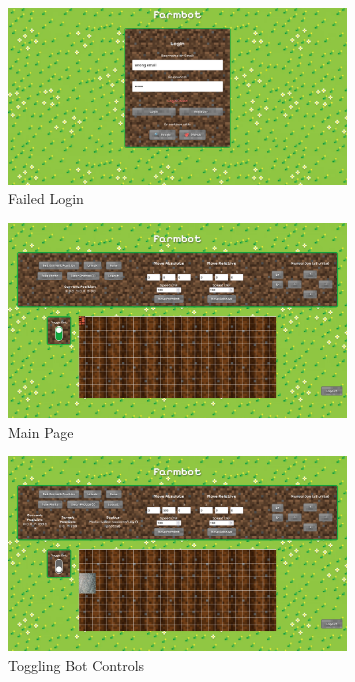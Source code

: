 \begin{figure}[H]
    \centering
    \includegraphics[width=0.8\textwidth]{img/failed_login.png}
    \caption{Failed Login}
    \label{fig:dashboard_failed_login}
\end{figure}

\begin{figure}[H]
    \centering
    \includegraphics[width=0.8\textwidth]{img/main_page.png}
    \caption{Main Page}
    \label{fig:dashboard_main_page}
\end{figure}

\begin{figure}[H]
    \centering
    \includegraphics[width=0.8\textwidth]{img/toggling_bot_controls.png}
    \caption{Toggling Bot Controls}
    \label{fig:dashboard_toggling_bot_controls}
\end{figure}

